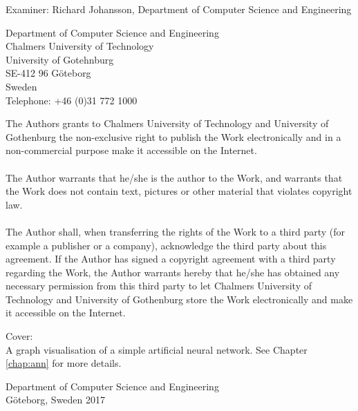 Examiner: Richard Johansson, Department of Computer Science and Engineering \setlength{\parskip}{1cm}

Department of Computer Science and Engineering\\
Chalmers University of Technology\\
University of Gotehnburg\\
SE-412 96 Göteborg\\
Sweden\\
Telephone: +46 (0)31 772 1000 \setlength{\parskip}{0.5cm}

\vfill
The Authors grants to Chalmers University of Technology and University of Gothenburg the non-exclusive right to publish the Work electronically and in a non-commercial purpose make it accessible on the Internet.\\\\
The Author warrants that he/she is the author to the Work, and warrants that the Work does not contain text, pictures or other material that violates copyright law.\\\\
The Author shall, when transferring the rights of the Work to a third party (for example a publisher or a company), acknowledge the third party about this agreement. If the Author has signed a copyright agreement with a third party regarding the Work, the Author warrants hereby that he/she has obtained any necessary permission from this third party to let Chalmers University of Technology and University of Gothenburg  store the Work electronically and make it accessible on the Internet.


\vfill
Cover:\\
A graph visualisation of a simple artificial neural network. See Chapter \ref{chap:ann} for more details. \setlength{\parskip}{0.5cm}

Department of Computer Science and Engineering\\
Göteborg, Sweden 2017

